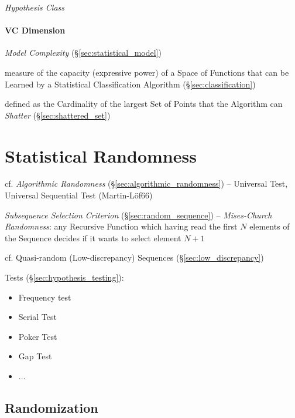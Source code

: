 \emph{Hypothesis Class}



\paragraph{VC Dimension}\label{sec:vc_dimension}\hfill

\emph{Model Complexity} (\S\ref{sec:statistical_model})

measure of the capacity (expressive power) of a Space of Functions that can be
Learned by a Statistical Classification Algorithm (\S\ref{sec:classification})

defined as the Cardinality of the largest Set of Points that the Algorithm can
\emph{Shatter} (\S\ref{sec:shattered_set})



\section{Statistical Randomness}\label{sec:statistical_randomness}

cf. \emph{Algorithmic Randomness} (\S\ref{sec:algorithmic_randomness}) --
Universal Test, Universal Sequential Test (Martin-L\"of66)

\emph{Subsequence Selection Criterion} (\S\ref{sec:random_sequence}) --
\emph{Mises-Church Randomness}: any Recursive Function which having read the
first $N$ elements of the Sequence decides if it wants to select element $N+1$

cf. Quasi-random (Low-discrepancy) Sequences (\S\ref{sec:low_discrepancy})

Tests (\S\ref{sec:hypothesis_testing}):
\begin{itemize}
  \item Frequency test
  \item Serial Test
  \item Poker Test
  \item Gap Test
  \item ...
\end{itemize}



\subsection{Randomization}\label{sec:randomization}

